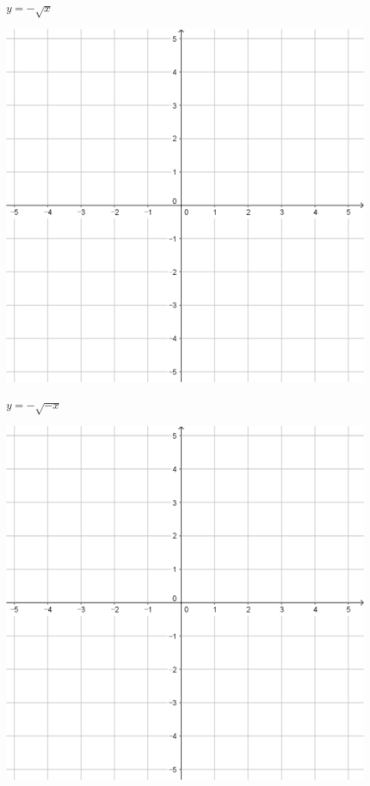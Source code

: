 \documentclass{oblivoir}
\begin{document}
\begin{minipage}{0.45\textwidth}\centering
\(y=-\sqrt x\)
\par\bigskip\includegraphics[width=0.9\textwidth]{55}
\end{minipage}
\begin{minipage}{0.45\textwidth}\centering
\(y=-\sqrt{-x}\)
\par\bigskip\includegraphics[width=0.9\textwidth]{55}
\end{minipage}\bigskip\bigskip\par
\end{document}
